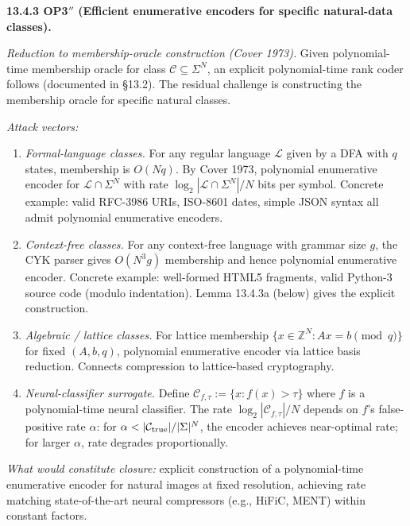\documentclass[
]{article}
\begin{document}
\textbf{13.4.3 OP3$''$ (Efficient enumerative encoders for specific
natural-data classes).}

\emph{Reduction to membership-oracle construction (Cover 1973).}
Given polynomial-time membership oracle for class $\mathcal{C}
\subseteq \Sigma^N$, an explicit polynomial-time rank coder follows
(documented in §13.2). The residual challenge is constructing the
membership oracle for specific natural classes.

\emph{Attack vectors:}
\begin{enumerate}
\item \emph{Formal-language classes.} For any regular language
$\mathcal{L}$ given by a DFA with $q$ states, membership is
$O(N q)$. By Cover 1973, polynomial enumerative encoder for
$\mathcal{L} \cap \Sigma^N$ with rate
$\log_2 |\mathcal{L} \cap \Sigma^N| / N$ bits per symbol. Concrete
example: valid RFC-3986 URIs, ISO-8601 dates, simple JSON syntax
all admit polynomial enumerative encoders.
\item \emph{Context-free classes.} For any context-free language with
grammar size $g$, the CYK parser gives $O(N^3 g)$ membership and
hence polynomial enumerative encoder. Concrete example: well-formed
HTML5 fragments, valid Python-3 source code (modulo indentation).
Lemma 13.4.3a (below) gives the explicit construction.
\item \emph{Algebraic / lattice classes.} For lattice membership
$\{x \in \mathbb{Z}^N : Ax = b \pmod q\}$ for fixed $(A, b, q)$,
polynomial enumerative encoder via lattice basis reduction.
Connects compression to lattice-based cryptography.
\item \emph{Neural-classifier surrogate.} Define
$\mathcal{C}_{f, \tau} := \{x : f(x) > \tau\}$ where $f$ is a
polynomial-time neural classifier. The rate $\log_2 |\mathcal{C}_{f,
\tau}| / N$ depends on $f$'s false-positive rate $\alpha$: for
$\alpha < |\mathcal{C}_{\rm true}| / |\Sigma|^N$, the encoder
achieves near-optimal rate; for larger $\alpha$, rate degrades
proportionally.
\end{enumerate}

\emph{What would constitute closure:} explicit construction of a
polynomial-time enumerative encoder for natural images at fixed
resolution, achieving rate matching state-of-the-art neural
compressors (e.g., HiFiC, MENT) within constant factors.
\end{document}
